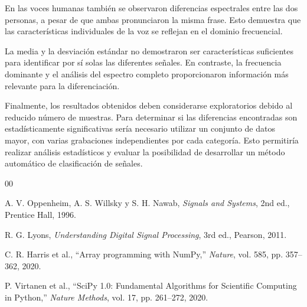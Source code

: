 \documentclass[conference]{IEEEtran}
\begin{document}
En las voces humanas también se observaron diferencias espectrales entre las dos personas, a pesar de que ambas pronunciaron la misma frase. Esto demuestra que las características individuales de la voz se reflejan en el dominio frecuencial.

La media y la desviación estándar no demostraron ser características suficientes para identificar por sí solas las diferentes señales. En contraste, la frecuencia dominante y el análisis del espectro completo proporcionaron información más relevante para la diferenciación.

Finalmente, los resultados obtenidos deben considerarse exploratorios debido al reducido número de muestras. Para determinar si las diferencias encontradas son estadísticamente significativas sería necesario utilizar un conjunto de datos mayor, con varias grabaciones independientes por cada categoría. Esto permitiría realizar análisis estadísticos y evaluar la posibilidad de desarrollar un método automático de clasificación de señales.



\begin{thebibliography}{00}

A. V. Oppenheim, A. S. Willsky y S. H. Nawab,
\textit{Signals and Systems},
2nd ed., Prentice Hall, 1996.

R. G. Lyons,
\textit{Understanding Digital Signal Processing},
3rd ed., Pearson, 2011.

C. R. Harris et al.,
``Array programming with NumPy,''
\textit{Nature}, vol. 585, pp. 357--362, 2020.

P. Virtanen et al.,
``SciPy 1.0: Fundamental Algorithms for Scientific Computing in Python,''
\textit{Nature Methods}, vol. 17, pp. 261--272, 2020.

\end{thebibliography}
\end{document}
